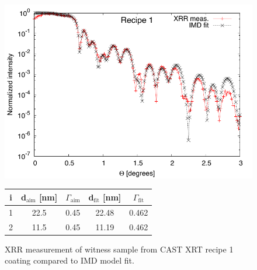 \begin{figure}[h!]
\centering
\begin{minipage}{.47\textwidth}
  \centering
  \includegraphics[width=\linewidth]{figures/cast/cast_recipe1_fit.pdf}
\end{minipage}%
\begin{minipage}{.53\textwidth}
  \centering
  \footnotesize
  \begin{tabular}{c|c|c|c|c}

i&d$_{\text{aim}}$ [nm]&$\Gamma_{\text{aim}}$&d$_{\text{fit}}$ [nm]&$\Gamma_{\text{fit}}$\\
  \hline
  1&22.5&0.45&22.48&0.462\\
  2&11.5&0.45&11.19&0.462
  \end{tabular}
\end{minipage}
\caption{\footnotesize XRR measurement of witness sample from CAST XRT recipe 1 coating compared to IMD model fit.}\label{fig:cast_fit_rec1}
\end{figure}

